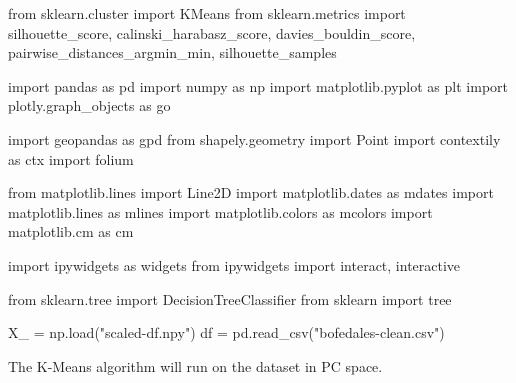 \documentclass[
  letterpaper,
  DIV=11,
  numbers=noendperiod]{scrreprt}
\newenvironment{Shaded}{\begin{snugshade}}{\end{snugshade}}
\newcommand{\ImportTok}[1]{\textcolor[rgb]{0.00,0.46,0.62}{#1}}
\newcommand{\NormalTok}[1]{\textcolor[rgb]{0.00,0.23,0.31}{#1}}
\newcommand{\OperatorTok}[1]{\textcolor[rgb]{0.37,0.37,0.37}{#1}}
\newcommand{\StringTok}[1]{\textcolor[rgb]{0.13,0.47,0.30}{#1}}
\begin{document}
\begin{Shaded}
\begin{Highlighting}[]
\ImportTok{from}\NormalTok{ sklearn.cluster }\ImportTok{import}\NormalTok{ KMeans}
\ImportTok{from}\NormalTok{ sklearn.metrics }\ImportTok{import}\NormalTok{ silhouette\_score, calinski\_harabasz\_score, davies\_bouldin\_score, pairwise\_distances\_argmin\_min, silhouette\_samples}

\ImportTok{import}\NormalTok{ pandas }\ImportTok{as}\NormalTok{ pd}
\ImportTok{import}\NormalTok{ numpy }\ImportTok{as}\NormalTok{ np}
\ImportTok{import}\NormalTok{ matplotlib.pyplot }\ImportTok{as}\NormalTok{ plt}
\ImportTok{import}\NormalTok{ plotly.graph\_objects }\ImportTok{as}\NormalTok{ go}

\ImportTok{import}\NormalTok{ geopandas }\ImportTok{as}\NormalTok{ gpd}
\ImportTok{from}\NormalTok{ shapely.geometry }\ImportTok{import}\NormalTok{ Point}
\ImportTok{import}\NormalTok{ contextily }\ImportTok{as}\NormalTok{ ctx}
\ImportTok{import}\NormalTok{ folium}

\ImportTok{from}\NormalTok{ matplotlib.lines }\ImportTok{import}\NormalTok{ Line2D}
\ImportTok{import}\NormalTok{ matplotlib.dates }\ImportTok{as}\NormalTok{ mdates}
\ImportTok{import}\NormalTok{ matplotlib.lines }\ImportTok{as}\NormalTok{ mlines}
\ImportTok{import}\NormalTok{ matplotlib.colors }\ImportTok{as}\NormalTok{ mcolors}
\ImportTok{import}\NormalTok{ matplotlib.cm }\ImportTok{as}\NormalTok{ cm}

\ImportTok{import}\NormalTok{ ipywidgets }\ImportTok{as}\NormalTok{ widgets}
\ImportTok{from}\NormalTok{ ipywidgets }\ImportTok{import}\NormalTok{ interact, interactive}

\ImportTok{from}\NormalTok{ sklearn.tree }\ImportTok{import}\NormalTok{ DecisionTreeClassifier}
\ImportTok{from}\NormalTok{ sklearn }\ImportTok{import}\NormalTok{ tree}
\end{Highlighting}
\end{Shaded}

\begin{Shaded}
\begin{Highlighting}[]
\NormalTok{X\_ }\OperatorTok{=}\NormalTok{ np.load(}\StringTok{"scaled{-}df.npy"}\NormalTok{)}
\NormalTok{df }\OperatorTok{=}\NormalTok{ pd.read\_csv(}\StringTok{"bofedales{-}clean.csv"}\NormalTok{)}
\end{Highlighting}
\end{Shaded}

The K-Means algorithm will run on the dataset in PC space.
\end{document}
